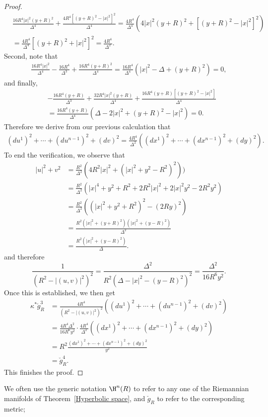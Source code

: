 \begin{proof}
\begin{align*}
&\frac{16R^4|x|^2(y+R)^2}{\Delta^4}+\frac{4R^4[(y+R)^2-|x|^2]^2}{\Delta^4}=\frac{4R^4}{\Delta^4}(4|x|^2(y+R)^2+[(y+R)^2-|x|^2]^2)\\
&=\frac{4R^4}{\Delta^4}[(y+R)^2+|x|^2]^2=\frac{4R^4}{\Delta^2}.
\end{align*}
Second, note that
\begin{align*}
\frac{16R^4|x|^2}{\Delta^4}-\frac{16R^4}{\Delta^3}+\frac{16R^4(y+R)^2}{\Delta^4}=\frac{16R^4}{\Delta^4}(|x|^2-\Delta+(y+R)^2)=0,
\end{align*}
and finally,
\begin{align*}
&-\frac{16R^4(y+R)}{\Delta^3}+\frac{32R^4|x|^2(y+R)}{\Delta^4}+\frac{16R^4(y+R)[(y+R)^2-|x|^2]}{\Delta^4}\\
&=\frac{16R^4(y+R)}{\Delta^4}(\Delta-2|x|^2+(y+R)^2-|x|^2)=0.
\end{align*}
Therefore we derive from our previous calculation that
\begin{align*}
(du^1)^2+\cdots+(du^{n-1})^2+(dv)^2=\frac{4R^4}{\Delta^2}((dx^1)^2+\cdots+(dx^{n-1})^2+(dy)^2).
\end{align*}
To end the verification, we observe that
\begin{align*}
|u|^2+v^2&=\frac{R^2}{\Delta^2}(4R^2|x|^2+(|x|^2+y^2-R^2)^2))\\
&=\frac{R^2}{\Delta^2}(|x|^4+y^2+R^2+2R^2|x|^2+2|x|^2y^2-2R^2y^2)\\
&=\frac{R^2}{\Delta^2}((|x|^2+y^2+R^2)^2-(2Ry)^2)\\
&=\frac{R^2(|x|^2+(y+R)^2)(|x|^2+(y-R)^2)}{\Delta^2}\\
&=\frac{R^2(|x|^2+(y-R)^2)}{\Delta}.
\end{align*}
and therefore
\[\frac{1}{(R^2-|(u,v)|^2)^2}=\frac{\Delta^2}{R^2(\Delta-|x|^2-(y-R)^2)^2}=\frac{\Delta^2}{16R^6y^2}.\]
Once this is established, we then get
\begin{align*}
\kappa^*\breve{g}^3_R&=\frac{4R^4}{(R^2-|(u,v)|^2)^2}((du^1)^2+\cdots+(du^{n-1})^2+(dv)^2)\\
&=\frac{4R^4\Delta^2}{16R^6y^2}\cdot\frac{4R^4}{\Delta^2}((dx^1)^2+\cdots+(dx^{n-1})^2+(dy)^2)\\
&=R^2\frac{(dx^1)^2+\cdots+(dx^{n-1})^2+(dy)^2}{y^2}\\
&=\breve{g}^4_R.
\end{align*}
This finishes the proof.
\end{proof}
We often use the generic notation $\H^n(R)$ to refer to any one of the Riemannian manifolds 
of Theorem~\ref{Hyperbolic space}, and $\breve{g}_R$ to refer to the corresponding metric; 
